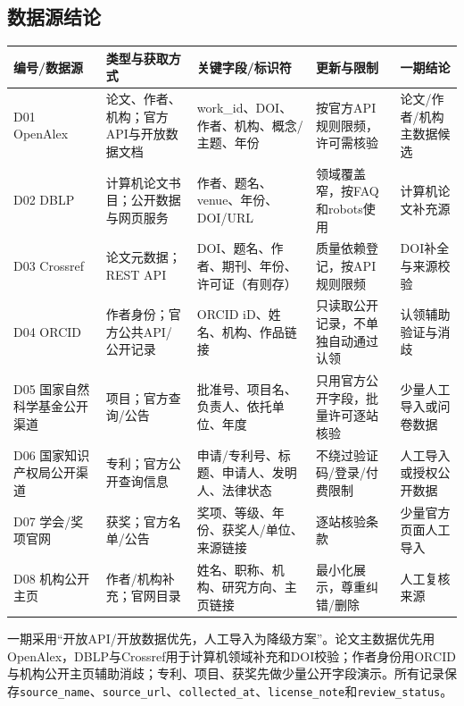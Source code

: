\documentclass[UTF8,11pt,a4paper]{ctexart}
\begin{document}
\subsection{数据源结论}
\begin{longtable}{p{2.5cm}p{3.2cm}p{3.4cm}p{3.1cm}p{2.3cm}}
\toprule 编号/数据源 & 类型与获取方式 & 关键字段/标识符 & 更新与限制 & 一期结论\\\midrule
D01 OpenAlex & 论文、作者、机构；官方API与开放数据文档 & work\_id、DOI、作者、机构、概念/主题、年份 & 按官方API规则限频，许可需核验 & 论文/作者/机构主数据候选\\
D02 DBLP & 计算机论文书目；公开数据与网页服务 & 作者、题名、venue、年份、DOI/URL & 领域覆盖窄，按FAQ和robots使用 & 计算机论文补充源\\
D03 Crossref & 论文元数据；REST API & DOI、题名、作者、期刊、年份、许可证（有则存） & 质量依赖登记，按API规则限频 & DOI补全与来源校验\\
D04 ORCID & 作者身份；官方公共API/公开记录 & ORCID iD、姓名、机构、作品链接 & 只读取公开记录，不单独自动通过认领 & 认领辅助验证与消歧\\
D05 国家自然科学基金公开渠道 & 项目；官方查询/公告 & 批准号、项目名、负责人、依托单位、年度 & 只用官方公开字段，批量许可逐站核验 & 少量人工导入或问卷数据\\
D06 国家知识产权局公开渠道 & 专利；官方公开查询信息 & 申请/专利号、标题、申请人、发明人、法律状态 & 不绕过验证码/登录/付费限制 & 人工导入或授权公开数据\\
D07 学会/奖项官网 & 获奖；官方名单/公告 & 奖项、等级、年份、获奖人/单位、来源链接 & 逐站核验条款 & 少量官方页面人工导入\\
D08 机构公开主页 & 作者/机构补充；官网目录 & 姓名、职称、机构、研究方向、主页链接 & 最小化展示，尊重纠错/删除 & 人工复核来源\\\bottomrule
\end{longtable}

一期采用“开放API/开放数据优先，人工导入为降级方案”。论文主数据优先用OpenAlex，DBLP与Crossref用于计算机领域补充和DOI校验；作者身份用ORCID与机构公开主页辅助消歧；专利、项目、获奖先做少量公开字段演示。所有记录保存\texttt{source\_name}、\texttt{source\_url}、\texttt{collected\_at}、\texttt{license\_note}和\texttt{review\_status}。
\end{document}
